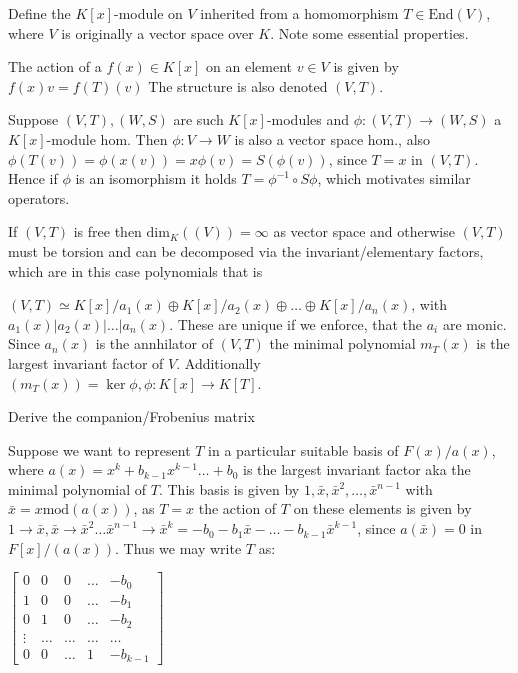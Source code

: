 Define the \(K[x]\)-module on \(V\) inherited from a homomorphism \(T \in \text{End}(V)\),
where \(V\) is originally a vector space over \(K\). Note some essential properties.

The action of a \(f(x) \in K[x]\) on an element \(v \in V\) is given by \(f(x)v = f(T)(v)\)
The structure is also denoted \((V, T)\).

Suppose \((V, T), (W, S)\) are such \(K[x]\)-modules and \(\phi : (V, T) \to (W, S)\)
a \(K[x]\)-module hom. Then \(\phi : V \to W\) is also a vector space hom., also
\(\phi(T(v)) = \phi(x(v)) = x\phi(v) = S(\phi(v))\), since \(T = x\) in \((V, T)\).
Hence if \(\phi\) is an isomorphism it holds \(T = \phi^{-1} \circ S \phi\), which motivates similar operators.

If \((V, T)\) is free then \(\text{dim}_{K}((V)) = \infty\) as vector space and otherwise 
\((V, T)\) must be torsion and can be decomposed via the invariant/elementary factors, which are in this case
polynomials that is

\((V, T) \simeq K[x]/a_1(x) \oplus K[x]/a_2(x) \oplus \dots \oplus K[x]/a_n(x)\), with \(a_1(x) | a_2(x) | \dots | a_n(x)\).
These are unique if we enforce, that the \(a_i\) are monic. Since \(a_n(x)\) is the annhilator of \((V, T)\) the minimal polynomial 
\(m_T(x)\) is the largest invariant factor of \(V\). Additionally \((m_T(x)) = \ker{\phi}, \phi : K[x] \to K[T]\).


Derive the companion/Frobenius matrix

Suppose we want to represent \(T\) in a particular suitable basis of \(F(x)/a(x)\), where \(a(x) = x^k + b_{k-1}x^{k-1} \dots + b_0\) is the largest
invariant factor aka the minimal polynomial of \(T\). This basis is given by \(1, \bar{x}, \bar{x}^2, \dots, \bar{x}^{n-1}\)
with \(\bar{x} = x \text{mod} (a(x))\), as \(T = x\) the action of \(T\) on these elements is given by \(1 \to \bar{x}, \bar{x} \to \bar{x}^2 \dots
\bar{x}^{n-1} \to \bar{x}^k = -b_0 - b_1\bar{x} - \dots - b_{k-1}\bar{x}^{k-1}\), since \(a(\bar{x}) = 0\) in \(F[x]/(a(x))\). Thus
we may write \(T\) as:

\(
\begin{bmatrix}
0 & 0 & 0 & \dots & -b_0 \\ 
1 & 0 & 0 & \dots & -b_1 \\ 
0 & 1 & 0 & \dots & -b_2 \\ 
\vdots & \dots & \dots & \dots & \dots \\ 
0 & 0 & \dots & 1 & -b_{k-1}
\end{bmatrix}
\)



